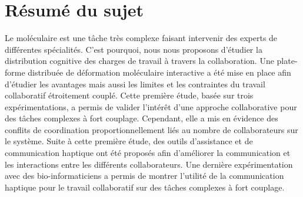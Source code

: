 \documentclass[10pt,myfrancais]{article}
\begin{document}
	\section*{Résumé du sujet}
	Le  moléculaire est une tâche très complexe faisant intervenir des experts de différentes spécialités.
	C'est pourquoi, nous nous proposons d'étudier la distribution cognitive des charges de travail à travers la collaboration.
	Une plate-forme distribuée de déformation moléculaire interactive a été mise en place afin d'étudier les avantages mais aussi les limites et les contraintes du travail collaboratif étroitement couplé.
	Cette première étude, basée sur trois expérimentations, a permis de valider l'intérêt d'une approche collaborative pour des tâches complexes à fort couplage.
	Cependant, elle a mis en évidence des conflits de coordination proportionnellement liés au nombre de collaborateurs sur le système.
	Suite à cette première étude, des outils d'assistance et de communication haptique ont été proposés afin d'améliorer la communication et les interactions entre les différents collaborateurs.
	Une dernière expérimentation avec des bio-informaticiens a permis de montrer l'utilité de la communication haptique pour le travail collaboratif sur des tâches complexes à fort couplage.
\end{document}
